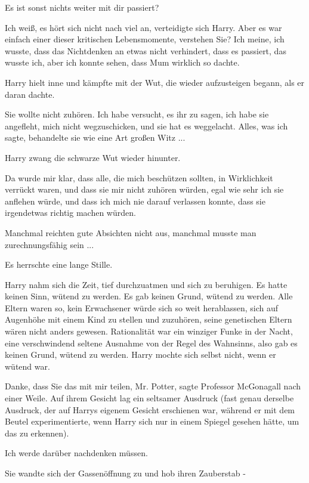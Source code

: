\glqq{}Es ist sonst nichts weiter mit dir passiert?\grqq{}

\glqq{}Ich weiß, es hört sich nicht nach viel an\grqq{}, verteidigte sich Harry.
\glqq{}Aber es war einfach einer dieser kritischen Lebensmomente, verstehen Sie?
Ich meine, ich wusste, dass das Nichtdenken an etwas nicht verhindert, dass es
passiert, das wusste ich, aber ich konnte sehen, dass Mum wirklich so
dachte.\grqq{}

Harry hielt inne und kämpfte mit der Wut, die wieder aufzusteigen begann, als er
daran dachte.

\glqq{}Sie wollte nicht zuhören. Ich habe versucht, es ihr zu sagen, ich habe
sie angefleht, mich nicht wegzuschicken, und sie hat es weggelacht. Alles, was
ich sagte, behandelte sie wie eine Art großen Witz ...\grqq{}

Harry zwang die schwarze Wut wieder hinunter.

\glqq{}Da wurde mir klar, dass alle, die mich beschützen sollten, in
Wirklichkeit verrückt waren, und dass sie mir nicht zuhören würden, egal wie
sehr ich sie anflehen würde, und dass ich mich nie darauf verlassen konnte, dass
sie irgendetwas richtig machen würden.\grqq{}

Manchmal reichten gute Absichten nicht aus, manchmal musste man zurechnungsfähig
sein ...

Es herrschte eine lange Stille.

Harry nahm sich die Zeit, tief durchzuatmen und sich zu beruhigen. Es hatte
keinen Sinn, wütend zu werden. Es gab keinen Grund, wütend zu werden. Alle
Eltern waren so, kein Erwachsener würde sich so weit herablassen, sich auf
Augenhöhe mit einem Kind zu stellen und zuzuhören, seine genetischen Eltern
wären nicht anders gewesen. Rationalität war ein winziger Funke in der Nacht,
eine verschwindend seltene Ausnahme von der Regel des Wahnsinns, also gab es
keinen Grund, wütend zu werden. Harry mochte sich selbst nicht, wenn er wütend
war.

\glqq{}Danke, dass Sie das mit mir teilen, Mr. Potter\grqq{}, sagte Professor
McGonagall nach einer Weile. Auf ihrem Gesicht lag ein seltsamer Ausdruck (fast
genau derselbe Ausdruck, der auf Harrys eigenem Gesicht erschienen war, während
er mit dem Beutel experimentierte, wenn Harry sich nur in einem Spiegel gesehen
hätte, um das zu erkennen).

\glqq{}Ich werde darüber nachdenken müssen.\grqq{}

Sie wandte sich der Gassenöffnung zu und hob ihren Zauberstab -

